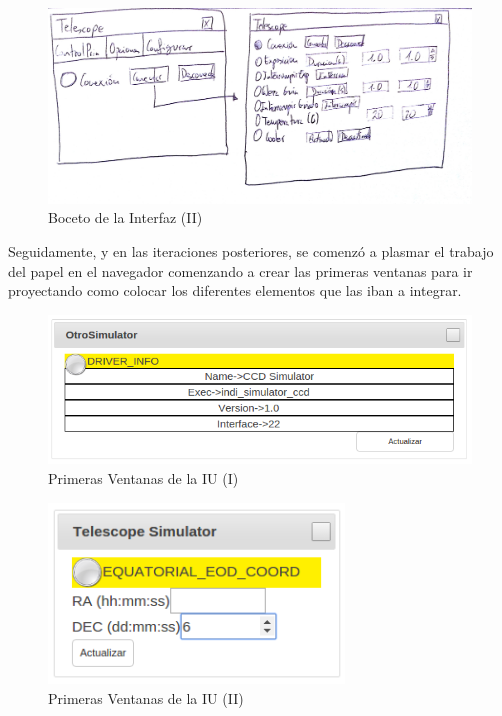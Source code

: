 \begin{figure}[htb]
\centering
\includegraphics[width=1\textwidth]{./imagenes/boceto2}
\caption{Boceto de la Interfaz (II)} \label{fig:boceto2}
\end{figure}

Seguidamente, y en las iteraciones posteriores, se comenzó a plasmar el trabajo del papel en el navegador comenzando a crear las primeras ventanas para ir proyectando como colocar los diferentes elementos que las iban a integrar.

\begin{figure}[htb]
\centering
\includegraphics[width=1\textwidth]{./imagenes/primerasVentanas1}
\caption{Primeras Ventanas de la IU (I)} \label{fig:primerasVentanas1}
\end{figure}

\begin{figure}[htb]
\centering
\includegraphics[width=0.7\textwidth]{./imagenes/primerasVentanas2}
\caption{Primeras Ventanas de la IU (II)} \label{fig:primerasVentanas2}
\end{figure}

